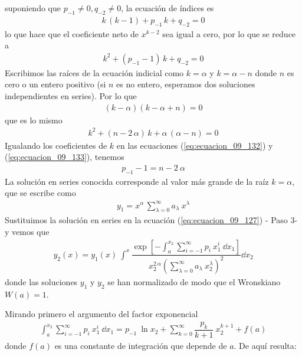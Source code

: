 suponiendo que $p_{-1} \neq 0, q_{-2} \neq 0$, la ecuación de índices es
\begin{align*}
k \, (k - 1) + p_{-1} \, k + q_{-2} = 0
\end{align*}
lo que hace que el coeficiente neto de $x^{k-2}$ sea igual a cero, por lo que se reduce a
\begin{align}
k^{2} + (p_{-1} - 1) \, k + q_{-2} = 0
\label{eq:ecuacion_09_132}
\end{align}
Escribimos las raíces de la ecuación indicial como $k = \alpha$ y $k= \alpha - n$ donde $n$ es cero o un entero positivo (si $n$ es no entero, esperamos dos soluciones independientes en series). Por lo que
\begin{align}
(k - \alpha)(k - \alpha + n) = 0
\label{eq:ecuacion_09_133}
\end{align}
que es lo mismo
\begin{align*}
k^{2} + (n - 2 \, \alpha) \, k + \alpha \, (\alpha - n) = 0
\end{align*}
Igualando los coeficientes de $k$ en las ecuaciones (\ref{eq:ecuacion_09_132}) y (\ref{eq:ecuacion_09_133}), tenemos
\begin{align}
p_{-1} -1 = n - 2 \: \alpha
\label{eq:ecuacion_09_134}
\end{align}
La solución en series conocida corresponde al valor más grande de la raíz $k = \alpha$, que se escribe como
\begin{align*}
y_{1} =  x^{\alpha} \, \sum_{\lambda=0}^{\infty} a_{\lambda} \: x^{\lambda}
\end{align*}
Sustituimos la solución en series en la ecuación (\ref{eq:ecuacion_09_127}) - Paso 3- y vemos que
\begin{align}
y_{2}(x) = y_{1} (x) \: \int^{x} \dfrac{\exp \left[ \displaystyle - \int_{a}^{x_{2}} \sum_{i=-1}^{\infty} p_{i} \: x^{i}_{1} \: \dd{x_{1}} \right] }{x_{2}^{2 \, \alpha} \left( \displaystyle \sum_{\lambda=0}^\infty a_{\lambda} \: x_{2}^{\lambda} \right)^{2} } \dd{x_{2}}
\label{eq:ecuacion_09_135}
\end{align}
donde las soluciones $y_{1}$ y $y_{2}$ se han normalizado de modo que el Wronskiano $W(a) = 1$. 
\par
Mirando primero el argumento del factor exponencial
\begin{align}
\int_{a}^{x_{2}} \sum_{i=-1}^{\infty} p_{i} \: x_{1}^{i} \: \dd{x_{1}} = p_{-1} \: \ln x_{2} + \sum_{k=0}^{\infty} \dfrac{p_{k}}{k + 1} \: x_{2}^{k + 1} + f(a)
\label{eq:ecuacion_09_136}
\end{align}
donde $f(a)$ es una constante de integración que depende de $a$. De aquí resulta:
